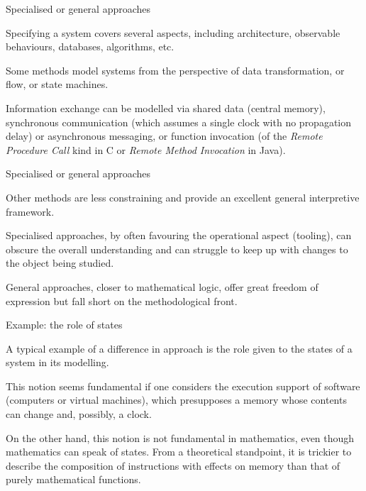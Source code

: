 \documentclass[compress,dvips,xcolor={dvipsnames},t]{beamer}
\begin{document}
%
\begin{frame}{Specialised or general approaches}

  Specifying a system covers several aspects, including architecture,
  observable behaviours, databases, algorithms, etc.

  \bigskip

  Some methods model systems from the perspective of data
  transformation, or flow, or state machines.

  \bigskip

  Information exchange can be modelled via shared data (central
  memory), synchronous communication (which assumes a single clock
  with no propagation delay) or asynchronous messaging, or function
  invocation (of the \emph{Remote Procedure Call} kind in \textsf{C}
  or \emph{Remote Method Invocation} in \textsf{Java}).

\end{frame}

%
\begin{frame}{Specialised or general approaches}

  Other methods are less constraining and provide an excellent general
  interpretive framework.

  \bigskip

  Specialised approaches, by often favouring the operational aspect
  (tooling), can obscure the overall understanding and can struggle to
  keep up with changes to the object being studied.

  \bigskip

  General approaches, closer to mathematical logic, offer great
  freedom of expression but fall short on the methodological front.

\end{frame}

%
\begin{frame}{Example: the role of states}

  A typical example of a difference in approach is the role given to
  the states of a system in its modelling.

  \bigskip

  This notion seems fundamental if one considers the execution support
  of software (computers or virtual machines), which presupposes a
  memory whose contents can change and, possibly, a clock.

  \bigskip

  On the other hand, this notion is not fundamental in mathematics,
  even though mathematics can speak of states. From a theoretical
  standpoint, it is trickier to describe the composition of
  instructions with effects on memory than that of purely mathematical
  functions.

\end{frame}
\end{document}
